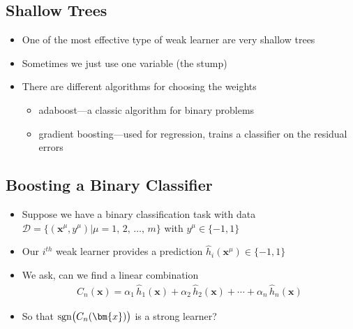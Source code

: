 
\begin{slide}
\section{Shallow Trees}

\begin{PauseHighLight}
  \begin{itemize}
  \item One of the most effective type of weak learner are very shallow
    trees\pause
  \item Sometimes we just use one variable (the stump)\pause
  \item There are different algorithms for choosing the weights
    \begin{itemize}
    \item adaboost\pause---a classic algorithm for binary problems\pauseb
    \item gradient boosting\pause---used for regression, trains a
      classifier on the residual errors\pauseb
    \end{itemize}
  \end{itemize}
\end{PauseHighLight}

\end{slide}

\begin{slide}
\section{Boosting a Binary Classifier}

\begin{PauseHighLight}
  \begin{itemize}
  \item Suppose we have a binary classification task with data
    $\mathcal{D} = \{(\bm{x}^\mu, y^\mu)| \mu=1,\,2,\,\ldots,\,
    m\}$ with $y^\mu\in\{-1,1\}$\pause
  \item Our $i^{th}$ weak learner provides a prediction
    $\hat{h}_i(\bm{x}^\mu)\in \{-1,1\}$\pause
  \item We ask, can we find a linear combination
    \begin{align*}
      C_n(\bm{x}) = \alpha_1 \, \hat{h}_1(\bm{x}) + \alpha_2 \,
      \hat{h}_2(\bm{x}) + \cdots +  \alpha_n \, \hat{h}_n(\bm{x})
    \end{align*}
  \item So that $\mathrm{sgn}\!\left(\strut C_n(\bm{x}) \right)$ is a
    strong learner?\pause
  \end{itemize}
\end{PauseHighLight}

\end{slide}

